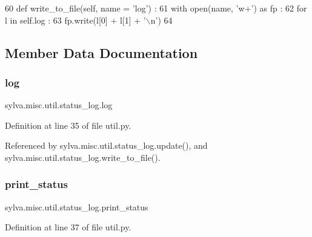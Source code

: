 \begin{DoxyCode}
60   \textcolor{keyword}{def }write\_to\_file(self, name = 'log') :
61     with open(name, \textcolor{stringliteral}{'w+'}) \textcolor{keyword}{as} fp :
62       \textcolor{keywordflow}{for} l \textcolor{keywordflow}{in} self.log :
63         fp.write(l[0] + l[1] + \textcolor{stringliteral}{'\(\backslash\)n'})
64 
\end{DoxyCode}


\subsection{Member Data Documentation}
\mbox{\label{classsylva_1_1misc_1_1util_1_1status__log_ab581acbcedf70a8afe11c96ea003e951}} 
\subsubsection{\texorpdfstring{log}{log}}
{\footnotesize\ttfamily sylva.\+misc.\+util.\+status\+\_\+log.\+log}



Definition at line 35 of file util.\+py.



Referenced by sylva.\+misc.\+util.\+status\+\_\+log.\+update(), and sylva.\+misc.\+util.\+status\+\_\+log.\+write\+\_\+to\+\_\+file().

\mbox{\label{classsylva_1_1misc_1_1util_1_1status__log_a6bed7b9c7fffc5bf27401ddf0481a71d}} 
\subsubsection{\texorpdfstring{print\+\_\+status}{print\_status}}
{\footnotesize\ttfamily sylva.\+misc.\+util.\+status\+\_\+log.\+print\+\_\+status}



Definition at line 37 of file util.\+py.



